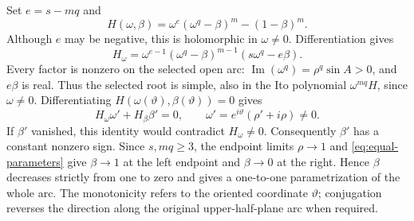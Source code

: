 \documentclass[11pt,a4paper]{article}
\theoremstyle{definition}
\theoremstyle{remark}
\numberwithin{equation}{section}
\begin{document}
Set $e=s-mq$ and
\[
 H(\omega,\beta)=\omega^e(\omega^q-\beta)^m-(1-\beta)^m.
\]
Although $e$ may be negative, this is holomorphic in $\omega\ne0$.
Differentiation gives
\[
 H_\omega
 =\omega^{e-1}(\omega^q-\beta)^{m-1}
       (s\omega^q-e\beta).
\]
Every factor is nonzero on the selected open arc:
$\operatorname{Im}(\omega^q)=\rho^q\sin A>0$, and $e\beta$ is real.
Thus the selected root is simple, also in the Ito polynomial
$\omega^{mq}H$, since $\omega\ne0$.
Differentiating $H(\omega(\vartheta),\beta(\vartheta))=0$ gives
\[
 H_\omega\omega'+H_\beta\beta'=0,\qquad
 \omega'=e^{i\vartheta}(\rho'+i\rho)\ne0.
\]
If $\beta'$ vanished, this identity would contradict $H_\omega\ne0$.
Consequently $\beta'$ has a constant nonzero sign. Since $s,mq\ge3$,
the endpoint limits $\rho\to1$ and \eqref{eq:equal-parameters} give
$\beta\to1$ at the left endpoint and $\beta\to0$ at the right.
Hence $\beta$ decreases strictly from one to zero and gives a
one-to-one parametrization of the whole arc. The monotonicity refers
to the oriented coordinate $\vartheta$; conjugation reverses the
direction along the original upper-half-plane arc when required.
\end{document}
